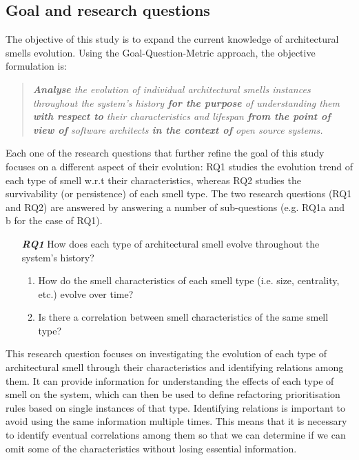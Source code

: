 \subsection{Goal and research questions}
The objective of this study is to expand the current knowledge of architectural smells evolution.
Using the Goal-Question-Metric \cite{VanSolingen2002} approach, the objective formulation is:
\begin{quote}\textit{
    \textbf{Analyse} the evolution of individual architectural smells instances throughout the system's history \textbf{for the purpose} of understanding them \textbf{with respect to} their  characteristics and lifespan \textbf{from the point of view of} software architects \textbf{in the context of} open source systems.} 
\end{quote} 
Each one of the research questions that further refine the goal of this study focuses on a different aspect of their evolution: RQ1 studies the evolution trend of each type of smell w.r.t their characteristics, whereas RQ2 studies the survivability (or persistence) of each smell type. 
The two research questions (RQ1 and RQ2) are answered by answering a number of sub-questions (e.g. RQ1a and b for the case of RQ1).

\begin{enumerate}
    \item[\textbf{\textit{RQ1}}] How does each type of architectural smell evolve throughout the system's history?
    \begin{enumerate}
        \item How do the smell characteristics of each smell type (i.e. size, centrality, etc.) evolve over time? 
        \item Is there a correlation between smell characteristics of the same smell type?
    \end{enumerate}
\end{enumerate}
This research question focuses on investigating the evolution of each type of architectural smell through their characteristics and identifying relations among them.
It can provide information for understanding the effects of each type of smell on the system, which can then be used to define refactoring prioritisation rules based on single instances of that type.
Identifying relations is important to avoid using the same information multiple times.
This means that it is necessary to identify eventual correlations among them so that we can determine if we can omit some of the characteristics without losing essential information.

